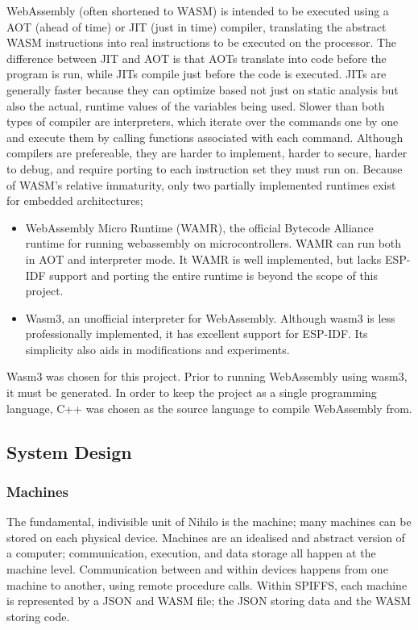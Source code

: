 \documentclass{article}
\begin{document}
WebAssembly (often shortened to WASM) is intended to be executed using a AOT (ahead of time)  or JIT (just in time) compiler, translating the abstract WASM instructions into real instructions to be executed on the processor.
The difference between JIT and AOT is that AOTs translate into code before the program is run, while JITs compile just before the code is executed.
JITs are generally faster because they can optimize based not just on static analysis but also the actual, runtime values of the variables being used.
Slower than both types of compiler are interpreters, which iterate over the commands one by one and execute them by calling functions associated with each command.
Although compilers are prefereable, they are harder to implement, harder to secure, harder to debug, and require porting to each instruction set they must run on.
Because of WASM's relative immaturity, only two partially implemented runtimes exist for embedded architectures;
\begin{itemize}
\item WebAssembly Micro Runtime (WAMR), the official Bytecode Alliance runtime for running webassembly on microcontrollers.
WAMR can run both in AOT and interpreter mode.
It WAMR is well implemented, but lacks ESP-IDF support and porting the entire runtime is beyond the scope of this project.
\item Wasm3, an unofficial interpreter for WebAssembly. 
Although wasm3 is less professionally implemented, it has excellent support for ESP-IDF.
Its simplicity also aids in modifications and experiments. 
\end{itemize}

Wasm3 was chosen for this project. Prior to running WebAssembly using wasm3, it must be generated. In order to keep the project as a single programming language, C++ was chosen as the source language to compile WebAssembly from.

\subsection{System Design}
\subsubsection{Machines}

The fundamental, indivisible unit of Nihilo is the machine; many machines can be stored on each physical device. Machines are an idealised and abstract version of a computer; communication, execution, and data storage all happen at the machine level. Communication between and within devices happens from one machine to another, using remote procedure calls. Within SPIFFS, each machine is represented by a JSON and WASM file; the JSON storing data and the WASM storing code.
\end{document}
